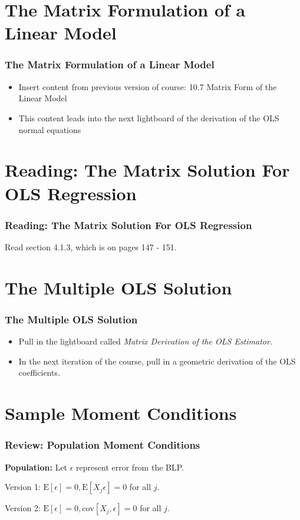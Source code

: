 \documentclass[12pt, block=fill]{beamer}
\newcommand{\E}{\text{E}}
\newcommand{\cov}{\text{cov}}
\begin{document}
\section{The Matrix Formulation of a Linear Model}

\begin{frame}
  \frametitle{The Matrix Formulation of a Linear Model}
  \begin{itemize}
  \item Insert content from previous version of course: 10.7 Matrix
    Form of the Linear Model
  \item This content leads into the next lightboard of the
    derivation of the OLS normal equations
  \end{itemize}   
\end{frame}


\section{Reading: The Matrix Solution For OLS Regression}

\begin{frame}
  \frametitle{Reading: The Matrix Solution For OLS Regression}
Read section 4.1.3, which is on pages 147 - 151.
\end{frame}

\section{The Multiple OLS Solution}


\begin{frame}
  \frametitle{The Multiple OLS Solution}
  
  \begin{itemize}
    \item Pull in the lightboard called \textit{Matrix Derivation of
        the OLS Estimator}.
    \item In the next iteration of the course, pull in a geometric
      derivation of the OLS coefficients. 
  \end{itemize} 
\end{frame}



\section{Sample Moment Conditions}

\begin{frame}[t]
  \frametitle{Review: Population Moment Conditions}
\textbf{Population:}  Let $\epsilon$ represent error from the BLP.

\vspace{.1cm}
Version 1: $\E[\epsilon]=0, \E[X_j \epsilon] = 0$  for all $j$.  

Version 2: $\E[\epsilon]=0, \cov[X_j,\epsilon]=0$ for all $j$. 


\end{frame}
\end{document}
